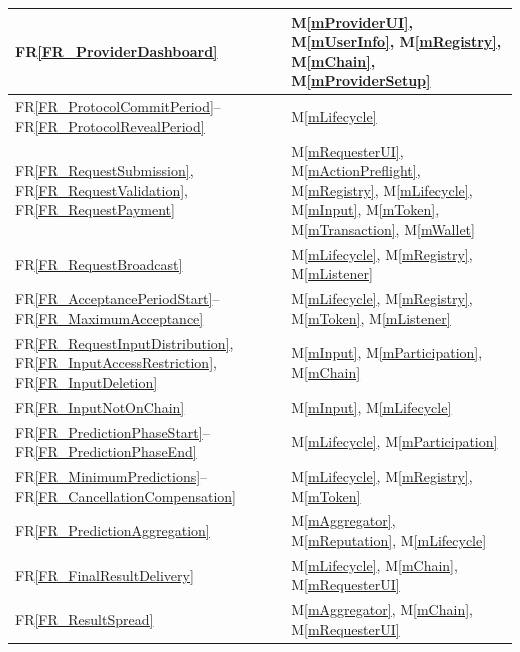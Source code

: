\documentclass[12pt, titlepage]{article}
\newcommand{\mref}[1]{M\ref{#1}}
\newcommand{\rref}[1]{FR\ref{#1}}
\begin{document}
\begin{longtable}{|p{}|p{}|}
\rref{FR_ProviderDashboard}
& \mref{mProviderUI}, \mref{mUserInfo}, \mref{mRegistry}, \mref{mChain},
\mref{mProviderSetup} \\
\hline

\rref{FR_ProtocolCommitPeriod}--\rref{FR_ProtocolRevealPeriod}
& \mref{mLifecycle} \\
\hline

\rref{FR_RequestSubmission}, \rref{FR_RequestValidation},
\rref{FR_RequestPayment}
& \mref{mRequesterUI}, \mref{mActionPreflight}, \mref{mRegistry},
\mref{mLifecycle}, \mref{mInput}, \mref{mToken}, \mref{mTransaction},
\mref{mWallet} \\
\hline

\rref{FR_RequestBroadcast}
& \mref{mLifecycle}, \mref{mRegistry}, \mref{mListener} \\
\hline

\rref{FR_AcceptancePeriodStart}--\rref{FR_MaximumAcceptance}
& \mref{mLifecycle}, \mref{mRegistry}, \mref{mToken}, \mref{mListener} \\
\hline

\rref{FR_RequestInputDistribution}, \rref{FR_InputAccessRestriction},
\rref{FR_InputDeletion}
& \mref{mInput}, \mref{mParticipation}, \mref{mChain} \\
\hline

\rref{FR_InputNotOnChain}
& \mref{mInput}, \mref{mLifecycle} \\
\hline

\rref{FR_PredictionPhaseStart}--\rref{FR_PredictionPhaseEnd}
& \mref{mLifecycle}, \mref{mParticipation} \\
\hline

\rref{FR_MinimumPredictions}--\rref{FR_CancellationCompensation}
& \mref{mLifecycle}, \mref{mRegistry}, \mref{mToken} \\
\hline

\rref{FR_PredictionAggregation}
& \mref{mAggregator}, \mref{mReputation}, \mref{mLifecycle} \\
\hline

\rref{FR_FinalResultDelivery}
& \mref{mLifecycle}, \mref{mChain}, \mref{mRequesterUI} \\
\hline

\rref{FR_ResultSpread}
& \mref{mAggregator}, \mref{mChain}, \mref{mRequesterUI} \\
\hline


\end{longtable}
\end{document}
